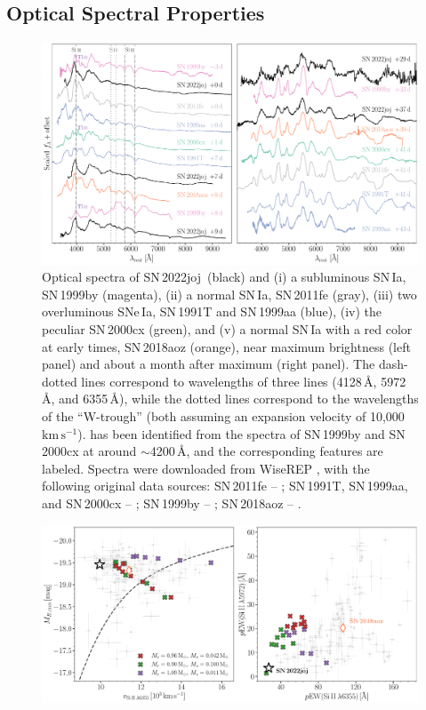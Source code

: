 \documentclass[twocolumn]{aastex631}
\newcommand{\sn}{SN\,2022joj}
\newcommand{\kms}{$\mathrm{km}\,\mathrm{s}^{-1}$}
\begin{document}
\begin{CJK*}{UTF8}{gbsn}
\subsection{Optical Spectral Properties} \label{sec:analysis_spec}
\begin{figure}
    \centering
    \includegraphics[width=\linewidth]{spec_comp.pdf}
    \caption{Optical spectra of \sn\ (black) and (i) a subluminous SN\,Ia, SN\,1999by (magenta), (ii) a normal SN\,Ia, SN\,2011fe (gray), (iii) two overluminous SNe\,Ia, SN\,1991T and SN\,1999aa (blue), (iv) the peculiar SN\,2000cx (green), and (v) a normal SN\,Ia with a red color at early times, SN\,2018aoz (orange), near maximum brightness (left panel) and about a month after maximum (right panel). The dash-dotted lines correspond to wavelengths of three  lines (4128\,\r{A}, 5972\,\r{A}, and 6355\,\r{A}), while the dotted lines correspond to the wavelengths of the  ``W-trough'' (both assuming an expansion velocity of 10,000\,\kms).  has been identified from the spectra of SN\,1999by and SN\,2000cx at around $\sim$4200\,\r{A}, and the corresponding features are labeled. Spectra were downloaded from WiseREP  \citep{wiserep_2012}, with the following original data sources: SN\,2011fe -- \citet{Pereira_2013, Mazzali_2014}; SN\,1991T, SN\,1999aa, and SN\,2000cx -- \citet{Silverman_UCBIa_2012}; SN\,1999by -- \citet{Matheson_cfaIa_2008}; SN\,2018aoz -- \citet{Ni_18aoz_2023}.}
    \label{fig:spec_comp}
\end{figure}
\begin{figure}
    \centering
    \includegraphics[width=\linewidth]{phase_space.pdf}

\end{figure}
\end{CJK*}
\end{document}
